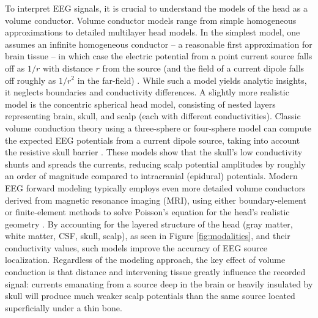\documentclass[final, a4paper,masters,en,listoffigures,listoftables,norwegiandates]{NMBU}
\begin{document}
To interpret EEG signals, it is crucial to understand the models of the head as a volume conductor. Volume conductor models range from simple homogeneous approximations to detailed multilayer head models. In the simplest model, one assumes an infinite homogeneous conductor – a reasonable first approximation for brain tissue – in which case the electric potential from a point current source falls off as $1/r$ with distance $r$ from the source (and the field of a current dipole falls off roughly as $1/r^2$ in the far-field) \cite{Nunez2006}. While such a model yields analytic insights, it neglects boundaries and conductivity differences. A slightly more realistic model is the concentric spherical head model, consisting of nested layers representing brain, skull, and scalp (each with different conductivities). Classic volume conduction theory using a three-sphere or four-sphere model can compute the expected EEG potentials from a current dipole source, taking into account the resistive skull barrier \cite{Nunez2006}. These models show that the skull’s low conductivity shunts and spreads the currents, reducing scalp potential amplitudes by roughly an order of magnitude compared to intracranial (epidural) potentials. Modern EEG forward modeling typically employs even more detailed volume conductors derived from magnetic resonance imaging (MRI), using either boundary-element or finite-element methods to solve Poisson’s equation for the head’s realistic geometry \cite{Halnes2024ElectricBrainSignals}. By accounting for the layered structure of the head (gray matter, white matter, CSF, skull, scalp), as seen in Figure \ref{fig:modalities}, and their conductivity values, such models improve the accuracy of EEG source localization. Regardless of the modeling approach, the key effect of volume conduction is that distance and intervening tissue greatly influence the recorded signal: currents emanating from a source deep in the brain or heavily insulated by skull will produce much weaker scalp potentials than the same source located superficially under a thin bone.
\end{document}
